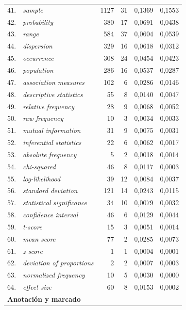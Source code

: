 \begin{longtable}{@{} r p{5cm} r r r r @{}}
41. & \textit{sample} & 1127 & 31 & 0{,}1369 & 0{,}1553 \\
42. & \textit{probability} & 380 & 17 & 0{,}0691 & 0{,}0438 \\
43. & \textit{range} & 584 & 37 & 0{,}0604 & 0{,}0539 \\
44. & \textit{dispersion} & 329 & 16 & 0{,}0618 & 0{,}0312 \\
45. & \textit{occurrence} & 308 & 24 & 0{,}0454 & 0{,}0423 \\
46. & \textit{population} & 286 & 16 & 0{,}0537 & 0{,}0287 \\
47. & \textit{association measures} & 102 & 6 & 0{,}0286 & 0{,}0146 \\
48. & \textit{descriptive statistics} & 55 & 8 & 0{,}0140 & 0{,}0047 \\
49. & \textit{relative frequency} & 28 & 9 & 0{,}0068 & 0{,}0052 \\
50. & \textit{raw frequency} & 10 & 3 & 0{,}0034 & 0{,}0033 \\
51. & \textit{mutual information} & 31 & 9 & 0{,}0075 & 0{,}0031 \\
52. & \textit{inferential statistics} & 22 & 6 & 0{,}0062 & 0{,}0017 \\
53. & \textit{absolute frequency} & 5 & 2 & 0{,}0018 & 0{,}0014 \\
54. & \textit{chi-squared} & 46 & 8 & 0{,}0117 & 0{,}0003 \\
55. & \textit{log-likelihood} & 39 & 12 & 0{,}0084 & 0{,}0037 \\
56. & \textit{standard deviation} & 121 & 14 & 0{,}0243 & 0{,}0115 \\
57. & \textit{statistical significance} & 34 & 10 & 0{,}0079 & 0{,}0032 \\
58. & \textit{confidence interval} & 46 & 6 & 0{,}0129 & 0{,}0044 \\
59. & \textit{t-score} & 15 & 3 & 0{,}0051 & 0{,}0014 \\
60. & \textit{mean score} & 77 & 2 & 0{,}0285 & 0{,}0073 \\
61. & \textit{z-score} & 1 & 1 & 0{,}0004 & 0{,}0001 \\
62. & \textit{deviation of proportions} & 2 & 2 & 0{,}0007 & 0{,}0003 \\
63. & \textit{normalized frequency} & 10 & 5 & 0{,}0030 & 0{,}0000 \\
64. & \textit{effect size} & 60 & 8 & 0{,}0153 & 0{,}0002 \\
\midrule
\multicolumn{6}{l}{\textbf{Anotación y marcado}} \\

\end{longtable}
